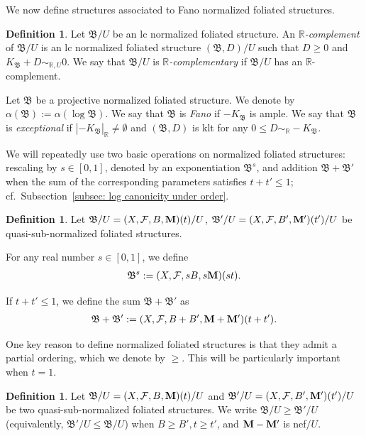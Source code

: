 \documentclass[11pt,reqno]{amsart}
\numberwithin{equation}{section}
\newcommand{\Mm}{{\bf{M}}}
\newcommand{\Bb}{{\mathfrak{B}}}
\newcommand{\Ff}{\mathcal{F}}
\theoremstyle{definition}
\newtheorem{defn}[thm]{Definition}
\begin{document}
We now define structures associated to Fano normalized foliated structures.

\begin{defn}
Let $\Bb/U$ be an lc normalized foliated structure. An \emph{$\mathbb R$-complement} of $\Bb/U$ is an lc normalized foliated structure $(\Bb,D)/U$ such that $D\geq 0$ and $K_{\Bb}+D\sim_{\mathbb R,U}0$. We say that $\Bb/U$ is \emph{$\mathbb R$-complementary} if $\Bb/U$ has an $\mathbb R$-complement. 

Let $\Bb$ be a projective normalized foliated structure. We denote by $\alpha(\Bb):=\alpha(\log\Bb)$. We say that $\Bb$ is \emph{Fano} if $-K_{\Bb}$ is ample. We say that $\Bb$ is \emph{exceptional} if $|-K_{\Bb}|_{\mathbb R}\neq\emptyset$ and $(\Bb,D)$ is klt for any $0\leq D\sim_{\mathbb R}-K_{\Bb}$.
\end{defn}

We will repeatedly use two basic operations on normalized foliated structures: rescaling by $s\in[0,1]$, denoted by an exponentiation $\Bb^s$, and addition $\Bb+\Bb'$ when the sum of the corresponding parameters satisfies $t+t'\leq 1$; cf.~Subsection~\ref{subsec: log canonicity under order}.

\begin{defn}
    Let 
    $\Bb/U=(X,\Ff,B,\Mm)(t)/U$, 
    $\Bb'/U=(X,\Ff,B',\Mm')(t')/U$ 
    be quasi-sub-normalized foliated structures. 

    For any real number $s\in [0,1]$, we define
        \begin{align*}
        \Bb^s:=(X,\Ff,sB,s\Mm)(st).    
        \end{align*}
    
    If 
    $t+t'\leq 1$, 
    we define the sum 
    $\Bb+\Bb'$ 
    as
        \begin{align*}
        \Bb+\Bb':=(X,\Ff,B+B',\Mm+\Mm')(t+t').    
        \end{align*}
\end{defn}

One key reason to define normalized foliated structures is that they admit a partial ordering, which we denote by $\geq$. 
This will be particularly important when $t=1$.

\begin{defn}\label{defn: order of nfs}
    Let $\Bb/U=(X,\Ff,B,\Mm)(t)/U$ and $\Bb'/U=(X,\Ff,B',\Mm')(t')/U$ be two quasi-sub-normalized foliated structures. We write $\Bb/U\geq\Bb'/U$
    (equivalently, $\Bb'/U\leq\Bb/U$) 
    when $B\geq B',t\geq t'$, and $\Mm-\Mm'$ is nef$/U$.
\end{defn}
\end{document}
